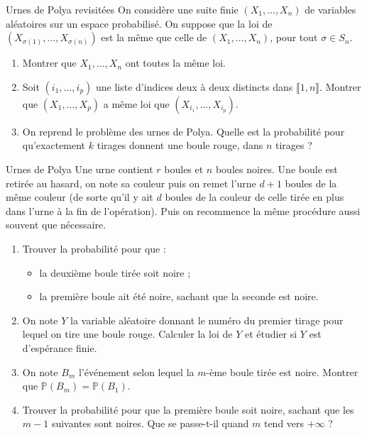 \documentclass[french,a4paper]{article}
\renewcommand{\P}{\mathbb{P}}
\theoremstyle{plain}
\theoremstyle{definition}
\theoremstyle{remark}
\begin{document}
\begin{ex}{Urnes de Polya revisitées}
	On considère une suite finie $(X_1,\ldots,X_n)$ de variables aléatoires sur un espace probabilisé. On suppose que la loi de $(X_{\sigma(1)},\ldots,X_{\sigma(n)})$ est la même que celle de $(X_1,\ldots,X_n)$, pour tout $\sigma\in S_n$.
	\begin{enumerate}
		\item Montrer que $X_1,\ldots,X_n$ ont toutes la même loi.
		\item Soit $(i_1,\ldots,i_p)$ une liste d'indices deux à deux distincts dans $\llbracket1,n\rrbracket$. Montrer que $(X_1,\ldots,X_p)$ a même loi que $(X_{i_1},\ldots,X_{i_p})$.
		\item On reprend le problème des urnes de Polya. Quelle est la probabilité pour qu'exactement $k$ tirages donnent une boule rouge, dans $n$ tirages ?
	\end{enumerate}
\end{ex}

\begin{ex}[Châteaux]{Urnes de Polya}
	Une urne contient $r$ boules et $n$ boules noires. Une boule est retirée au hasard, on note sa couleur puis on remet l'urne $d+1$ boules de la même couleur (de sorte qu'il y ait $d$ boules de la couleur de celle tirée en plus dans l'urne à la fin de l'opération). Puis on recommence la même procédure aussi souvent que nécessaire.
	\begin{enumerate}
		\item Trouver la probabilité pour que : 
		\begin{itemize}
			\item la deuxième boule tirée soit noire ;
			\item la première boule ait été noire, sachant que la seconde est noire.
		\end{itemize}
		\item On note $Y$ la variable aléatoire donnant le numéro du premier tirage pour lequel on tire une boule rouge. Calculer la loi de $Y$ et étudier si $Y$ est d'espérance finie.
		\item On note $B_m$ l'événement selon lequel la $m$-ème boule tirée est noire. Montrer que $\P(B_m)=\P(B_1)$.
		\item Trouver la probabilité pour que la première boule soit noire, sachant que les $m-1$ suivantes sont noires. Que se passe-t-il quand $m$ tend vers $+\infty$ ?
	\end{enumerate}
\end{ex}
\end{document}
